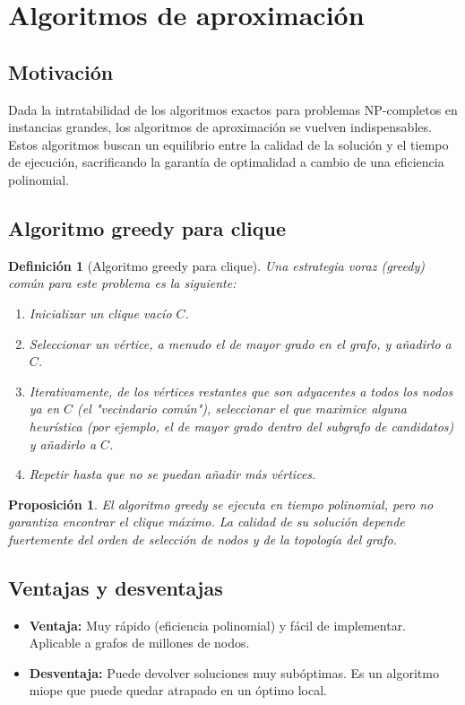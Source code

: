 \documentclass[12pt,a4paper]{report}
\newtheorem{definicion}{Definición}[chapter]
\newtheorem{proposicion}{Proposición}[chapter]
\begin{document}
\section{Algoritmos de aproximación}
\subsection{Motivación}
Dada la intratabilidad de los algoritmos exactos para problemas NP-completos en instancias grandes, los algoritmos de aproximación se vuelven indispensables. Estos algoritmos buscan un equilibrio entre la calidad de la solución y el tiempo de ejecución, sacrificando la garantía de optimalidad a cambio de una eficiencia polinomial.

\subsection{Algoritmo greedy para clique}
\begin{definicion}[Algoritmo greedy para clique]
Una estrategia voraz (greedy) común para este problema es la siguiente:
\begin{enumerate}
    \item Inicializar un clique vacío $C$.
    \item Seleccionar un vértice, a menudo el de mayor grado en el grafo, y añadirlo a $C$.
    \item Iterativamente, de los vértices restantes que son adyacentes a todos los nodos ya en $C$ (el "vecindario común"), seleccionar el que maximice alguna heurística (por ejemplo, el de mayor grado dentro del subgrafo de candidatos) y añadirlo a $C$.
    \item Repetir hasta que no se puedan añadir más vértices.
\end{enumerate}
\end{definicion}

\begin{proposicion}
El algoritmo greedy se ejecuta en tiempo polinomial, pero no garantiza encontrar el clique máximo. La calidad de su solución depende fuertemente del orden de selección de nodos y de la topología del grafo.
\end{proposicion}

\subsection{Ventajas y desventajas}
\begin{itemize}
    \item \textbf{Ventaja:} Muy rápido (eficiencia polinomial) y fácil de implementar. Aplicable a grafos de millones de nodos.
    \item \textbf{Desventaja:} Puede devolver soluciones muy subóptimas. Es un algoritmo miope que puede quedar atrapado en un óptimo local.
\end{itemize}
\end{document}
